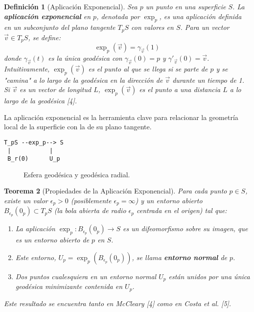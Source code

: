 \documentclass[12pt, a4paper]{report}
\theoremstyle{miestilo}
\newtheorem{teorema}{Teorema}[chapter]
\theoremstyle{midefinicion}
\newtheorem{definicion}[teorema]{Definición}
\begin{document}
\begin{definicion}[Aplicación Exponencial]
Sea $p$ un punto en una superficie $S$. La \textbf{aplicación exponencial} en $p$, denotada por $\exp_p$, es una aplicación definida en un subconjunto del plano tangente $T_pS$ con valores en $S$. Para un vector $\vec{v} \in T_pS$, se define:
$$\exp_p(\vec{v}) = \gamma_{\vec{v}}(1)$$
donde $\gamma_{\vec{v}}(t)$ es la única geodésica con $\gamma_{\vec{v}}(0) = p$ y $\gamma'_{\vec{v}}(0) = \vec{v}$.
Intuitivamente, $\exp_p(\vec{v})$ es el punto al que se llega si se parte de $p$ y se "camina" a lo largo de la geodésica en la dirección de $\vec{v}$ durante un tiempo de 1. Si $\vec{v}$ es un vector de longitud $L$, $\exp_p(\vec{v})$ es el punto a una distancia $L$ a lo largo de la geodésica [4].
\end{definicion}

La aplicación exponencial es la herramienta clave para relacionar la geometría local de la superficie con la de su plano tangente.
\begin{center}
\begin{verbatim}
T_pS --exp_p--> S
 |           |
 B_r(0)      U_p
\end{verbatim}
\end{center}
\begin{figure}[h]
\centering
{}
\caption{Esfera geod\'esica y geod\'esica radial.}
\end{figure}





\begin{teorema}[Propiedades de la Aplicación Exponencial]
Para cada punto $p \in S$, existe un valor $\epsilon_p > 0$ (posiblemente $\epsilon_p = \infty$) y un entorno abierto $B_{\epsilon_p}(0_p) \subset T_pS$ (la bola abierta de radio $\epsilon_p$ centrada en el origen) tal que:
\begin{enumerate}
    \item La aplicación $\exp_p: B_{\epsilon_p}(0_p) \to S$ es un difeomorfismo sobre su imagen, que es un entorno abierto de $p$ en $S$.
    \item Este entorno, $U_p = \exp_p(B_{\epsilon_p}(0_p))$, se llama \textbf{entorno normal} de $p$.
    \item Dos puntos cualesquiera en un entorno normal $U_p$ están unidos por una única geodésica minimizante contenida en $U_p$.
\end{enumerate}
Este resultado se encuentra tanto en McCleary [4] como en Costa et al. [5].
\end{teorema}
\end{document}
